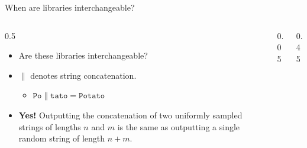 \ifdefined\PRESENTATION\else\PassOptionsToClass{handout}{beamer}\fi\documentclass[aspectratio=169, lualatex]{beamer}
\begin{document}
\begin{frame}{When are libraries interchangeable?}
	\begin{columns}[c]
		\begin{column}{0.5\textwidth}
			\begin{itemize}[<+->]
				\item Are these libraries interchangeable?
				\item $\|$ denotes string concatenation.
				      \begin{itemize}
					      \item $\texttt{Po} \| \texttt{tato} = \texttt{Potato}$
				      \end{itemize}
				\item \textbf{Yes!} Outputting the concatenation of two uniformly sampled strings of lengths $n$ and $m$ is the same as outputting a single random string of length $n + m$.
			\end{itemize}
		\end{column}
		\begin{column}{0.05\textwidth}
		\end{column}
		\begin{column}{0.45\textwidth}
		\end{column}
	\end{columns}
\end{frame}
\end{document}
